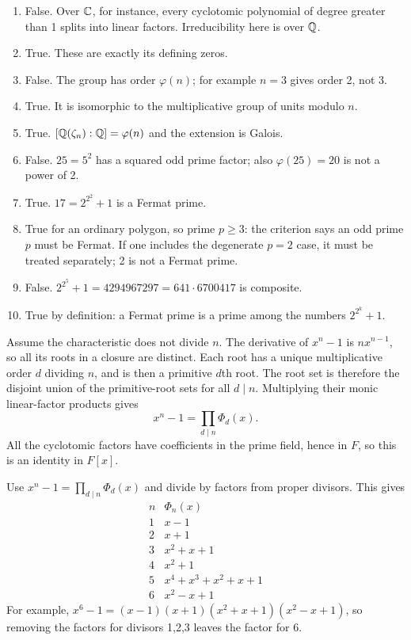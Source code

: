 \begin{enumerate}[label=(\alph*)]
\item False. Over $\mathbb{C}$, for instance, every cyclotomic polynomial of degree greater than 1 splits into linear factors. Irreducibility here is over $\mathbb{Q}$.
\item True. These are exactly its defining zeros.
\item False. The group has order $\varphi(n)$; for example $n=3$ gives order 2, not 3.
\item True. It is isomorphic to the multiplicative group of units modulo $n$.
\item True. $[\mathbb{Q}(\zeta_n):\mathbb{Q}]=\varphi(n)$ and the extension is Galois.
\item False. $25=5^2$ has a squared odd prime factor; also $\varphi(25)=20$ is not a power of 2.
\item True. $17=2^{2^2}+1$ is a Fermat prime.
\item True for an ordinary polygon, so prime $p\ge3$: the criterion says an odd prime $p$ must be Fermat. If one includes the degenerate $p=2$ case, it must be treated separately; 2 is not a Fermat prime.
\item False. $2^{2^5}+1=4294967297=641\cdot6700417$ is composite.
\item True by definition: a Fermat prime is a prime among the numbers $2^{2^k}+1$.
\end{enumerate}

Assume the characteristic does not divide $n$. The derivative of $x^n-1$ is $nx^{n-1}$, so all its roots in a closure are distinct. Each root has a unique multiplicative order $d$ dividing $n$, and is then a primitive $d$th root. The root set is therefore the disjoint union of the primitive-root sets for all $d\mid n$. Multiplying their monic linear-factor products gives
\[x^n-1=\prod_{d\mid n}\Phi_d(x).\]
All the cyclotomic factors have coefficients in the prime field, hence in $F$, so this is an identity in $F[x]$.

Use $x^n-1=\prod_{d\mid n}\Phi_d(x)$ and divide by factors from proper divisors. This gives
\[
\begin{array}{c|l}
n&\Phi_n(x)\\\hline
1&x-1\\2&x+1\\3&x^2+x+1\\4&x^2+1\\5&x^4+x^3+x^2+x+1\\6&x^2-x+1
\end{array}
\]
For example, $x^6-1=(x-1)(x+1)(x^2+x+1)(x^2-x+1)$, so removing the factors for divisors 1,2,3 leaves the factor for 6.

